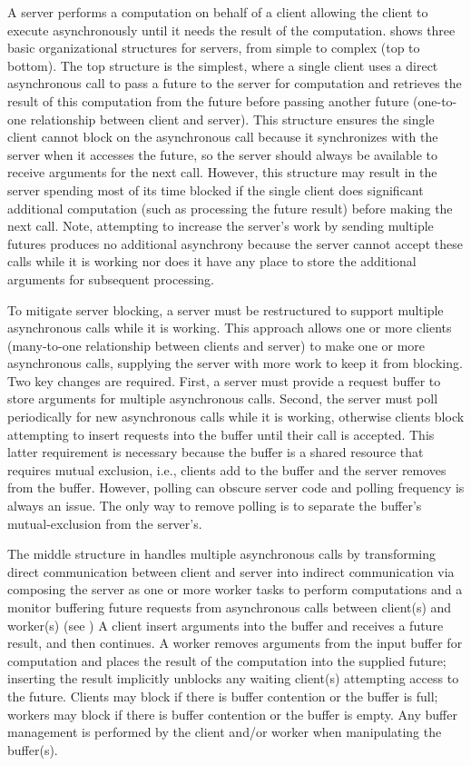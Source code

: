 \documentclass[openright,twoside]{report}
\begin{document}
A server performs a computation on behalf of a client allowing the client to execute asynchronously until it needs the result of the computation.
 shows three basic organizational structures for servers, from simple to complex (top to bottom).
The top structure is the simplest, where a single client uses a direct asynchronous call to pass a future to the server for computation and retrieves the result of this computation from the future before passing another future (one-to-one relationship between client and server).
This structure ensures the single client cannot block on the asynchronous call because it synchronizes with the server when it accesses the future, so the server should always be available to receive arguments for the next call.
However, this structure may result in the server spending most of its time blocked if the single client does significant additional computation (such as processing the future result) before making the next call.
Note, attempting to increase the server's work by sending multiple futures produces no additional asynchrony because the server cannot accept these calls while it is working nor does it have any place to store the additional arguments for subsequent processing.

To mitigate server blocking, a server must be restructured to support multiple asynchronous calls while it is working.
This approach allows one or more clients (many-to-one relationship between clients and server) to make one or more asynchronous calls, supplying the server with more work to keep it from blocking.
Two key changes are required.
First, a server must provide a request buffer to store arguments for multiple asynchronous calls.
Second, the server must poll periodically for new asynchronous calls while it is working, otherwise clients block attempting to insert requests into the buffer until their call is accepted.
This latter requirement is necessary because the buffer is a shared resource that requires mutual exclusion, i.e., clients add to the buffer and the server removes from the buffer.
However, polling can obscure server code and polling frequency is always an issue.
The only way to remove polling is to separate the buffer's mutual-exclusion from the server's.

The middle structure in  handles multiple asynchronous calls by transforming direct communication between client and server into indirect communication via composing the server as one or more worker tasks to perform computations and a monitor buffering future requests from asynchronous calls between client(s) and worker(s) (see )
A client insert arguments into the buffer and receives a future result, and then continues.
A worker removes arguments from the input buffer for computation and places the result of the computation into the supplied future;
inserting the result implicitly unblocks any waiting client(s) attempting access to the future.
Clients may block if there is buffer contention or the buffer is full;
workers may block if there is buffer contention or the buffer is empty.
Any buffer management is performed by the client and/or worker when manipulating the buffer(s).
\end{document}
